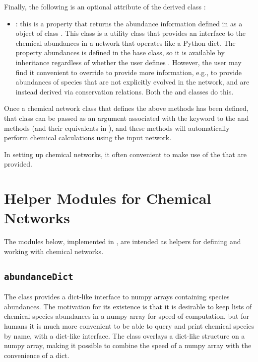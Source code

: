 \documentclass[letterpaper,10pt,english]{sphinxmanual}
\begin{document}
Finally, the following is an optional attribute of the derived class
:
\begin{itemize}
\item {} 
: this is a property that returns the abundance
information defined in  as a object of class
{\hyperref[chemistry:sssec-abundancedict]{\emph{}}}. This class is a utility class that
provides an interface to the chemical abundances in a network
that operates like a Python dict. The property abundances is defined
in the base  class, so it is available by inheritance
regardless of whether the user defines . However,
the user may find it convenient to override
 to provide more information, e.g., to
provide abundances of species that are not explicitly evolved in the
network, and are instead derived via conservation relations. Both
the {\hyperref[chemistry:sssec-nl99]{\emph{}}} and {\hyperref[chemistry:sssec-nl99-gc]{\emph{}}} classes do this.

\end{itemize}

Once a chemical network class that defines the above methods has been
defined, that class can be passed as an argument associated with the
 keyword to the  and 
methods (and their equivalents in ), and these methods
will automatically perform chemical calculations using the input
network.

In setting up chemical networks, it often convenient to make use of
the {\hyperref[chemistry:ssec-chemhelpers]{\emph{}}} that are provided.


\section{Helper Modules for Chemical Networks}
\label{chemistry:ssec-chemhelpers}\label{chemistry:helper-modules-for-chemical-networks}
The modules below, implemented in , are intended
as helpers for defining and working with chemical networks.


\subsection{\texttt{abundanceDict}}
\label{chemistry:sssec-abundancedict}\label{chemistry:abundancedict}
The  class provides a dict-like interface to numpy
arrays containing species abundances. The motivation for its existence
is that it is desirable to keep lists of chemical species abundances
in a numpy array for speed of computation, but for humans it is much
more convenient to be able to query and print chemical species by
name, with a dict-like interface. The  class overlays
a dict-like structure on a numpy array, making it possible to combine
the speed of a numpy array with the convenience of a dict.
\end{document}
